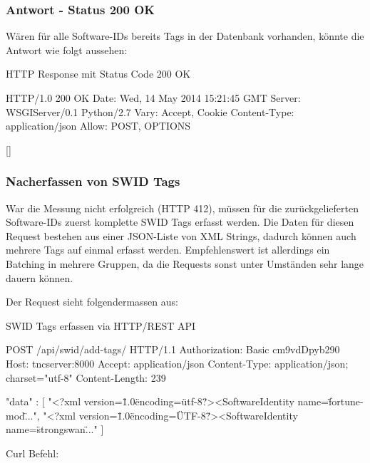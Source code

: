 \subsubsection*{Antwort - Status 200 OK}

Wären für alle Software-IDs bereits Tags in der Datenbank vorhanden, könnte die Antwort wie folgt aussehen:

\begin{listing}
\caption{HTTP Response mit Status Code 200 OK}
\begin{httpcode}
HTTP/1.0 200 OK
Date: Wed, 14 May 2014 15:21:45 GMT
Server: WSGIServer/0.1 Python/2.7
Vary: Accept, Cookie
Content-Type: application/json
Allow: POST, OPTIONS

[]
\end{httpcode}
\end{listing}

\subsubsection*{Nacherfassen von SWID Tags}
War die Messung nicht erfolgreich (HTTP 412), müssen für die zurückgelieferten Software-IDs
zuerst komplette SWID Tags erfasst werden. Die Daten für diesen Request bestehen aus einer JSON-Liste von XML Strings, dadurch können auch
mehrere Tags auf einmal erfasst werden. Empfehlenswert ist allerdings ein Batching in mehrere Gruppen, da die Requests sonst unter Umständen sehr lange
dauern können. 

\pagebreak
Der Request sieht folgendermassen aus:

\begin{listing}
\caption{SWID Tags erfassen via HTTP/REST API}
\begin{httpcode}
POST /api/swid/add-tags/ HTTP/1.1
Authorization: Basic cm9vdDpyb290
Host: tncserver:8000
Accept: application/json
Content-Type: application/json; charset="utf-8"
Content-Length: 239

{ "data" : 
	[
		"<?xml version=\"1.0\" encoding=\"utf-8\"?><SoftwareIdentity name=\"fortune-mod\"...",
		"<?xml version=\"1.0\" encoding=\"UTF-8\"?><SoftwareIdentity name=\"strongswan\"..."
	]
}

\end{httpcode}
\end{listing}

Curl Befehl:


